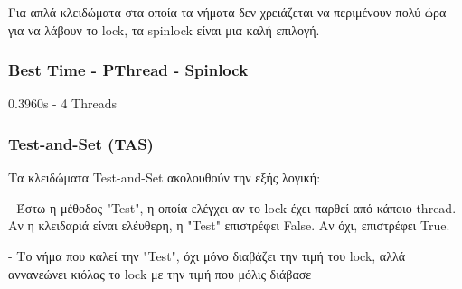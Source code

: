 \documentclass[../final_report.tex]{subfiles}
\begin{document}
Για απλά κλειδώματα στα οποία τα νήματα δεν χρειάζεται να περιμένουν πολύ ώρα για να λάβουν το lock, τα spinlock
είναι μια καλή επιλογή.

\subsubsection*{Best Time - PThread - Spinlock}
0.3960s - 4 Threads


\subsubsection{Test-and-Set (TAS)}

Τα κλειδώματα Test-and-Set ακολουθούν την εξής λογική:

- Έστω η μέθοδος "Test", η οποία ελέγχει αν το lock έχει παρθεί από κάποιο thread. Αν η κλειδαριά
είναι ελέυθερη, η "Test" επιστρέφει False. Αν όχι, επιστρέφει True.

- Το νήμα που καλεί την "Test", όχι μόνο διαβάζει την τιμή του lock, αλλά αννανεώνει κιόλας το lock 
με την τιμή που μόλις διάβασε
\end{document}
